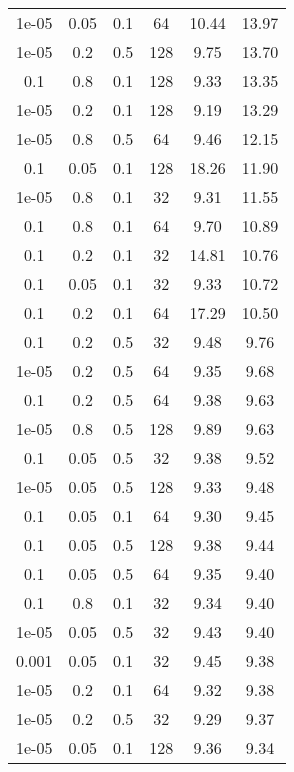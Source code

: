 \documentclass{article}
\begin{document}
\begin{table}[h]
\begin{tabular}{cccccc}
        1e-05 & 0.05 & 0.1 & 64 & 10.44 & 13.97 \\
        1e-05 & 0.2 & 0.5 & 128 & 9.75 & 13.70 \\
        0.1 & 0.8 & 0.1 & 128 & 9.33 & 13.35 \\
        1e-05 & 0.2 & 0.1 & 128 & 9.19 & 13.29 \\
        1e-05 & 0.8 & 0.5 & 64 & 9.46 & 12.15 \\
        0.1 & 0.05 & 0.1 & 128 & 18.26 & 11.90 \\
        1e-05 & 0.8 & 0.1 & 32 & 9.31 & 11.55 \\
        0.1 & 0.8 & 0.1 & 64 & 9.70 & 10.89 \\
        0.1 & 0.2 & 0.1 & 32 & 14.81 & 10.76 \\
        0.1 & 0.05 & 0.1 & 32 & 9.33 & 10.72 \\
        0.1 & 0.2 & 0.1 & 64 & 17.29 & 10.50 \\
        0.1 & 0.2 & 0.5 & 32 & 9.48 & 9.76 \\
        1e-05 & 0.2 & 0.5 & 64 & 9.35 & 9.68 \\
        0.1 & 0.2 & 0.5 & 64 & 9.38 & 9.63 \\
        1e-05 & 0.8 & 0.5 & 128 & 9.89 & 9.63 \\
        0.1 & 0.05 & 0.5 & 32 & 9.38 & 9.52 \\
        1e-05 & 0.05 & 0.5 & 128 & 9.33 & 9.48 \\
        0.1 & 0.05 & 0.1 & 64 & 9.30 & 9.45 \\
        0.1 & 0.05 & 0.5 & 128 & 9.38 & 9.44 \\
        0.1 & 0.05 & 0.5 & 64 & 9.35 & 9.40 \\
        0.1 & 0.8 & 0.1 & 32 & 9.34 & 9.40 \\
        1e-05 & 0.05 & 0.5 & 32 & 9.43 & 9.40 \\
        0.001 & 0.05 & 0.1 & 32 & 9.45 & 9.38 \\
        1e-05 & 0.2 & 0.1 & 64 & 9.32 & 9.38 \\
        1e-05 & 0.2 & 0.5 & 32 & 9.29 & 9.37 \\
        1e-05 & 0.05 & 0.1 & 128 & 9.36 & 9.34 \\
        \bottomrule
    \end{tabular}
    \label{tab:ndqn_results}
\end{table}
\end{document}
